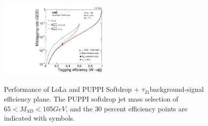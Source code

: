 \begin{figure}[htb]
\centering
\includegraphics[width=0.49\textwidth]{figures/vtagging/AN-18-099/validation/roc_ZpWqqvsQCD.pdf}\\

\caption{Performance of LoLa and  PUPPI Softdrop + $\tau_{21}$background-signal efficiency plane. The PUPPI softdrop jet mass
selection of $65 < M_{SD} < 105 GeV$, and the 30 percent efficiency points are indicated with symbols.}
\label{fig:roc_val}
\end{figure}


